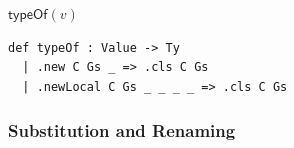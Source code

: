 \begin{cmp}{$\mathsf{typeOf}(v)$}
\begin{paperside}
\end{paperside}
\begin{leanside}
\begin{lstlisting}[style=leanside]
def typeOf : Value -> Ty
  | .new C Gs _ => .cls C Gs
  | .newLocal C Gs _ _ _ _ => .cls C Gs
\end{lstlisting}
\end{leanside}
\nomapping
\end{cmp}

\subsubsection{Substitution and Renaming}

